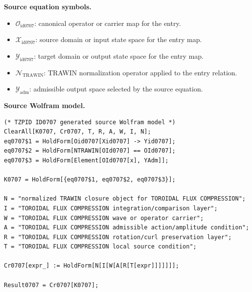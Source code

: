 \begin{minipage}[t]{0.49\linewidth}
\begingroup
\small
\raggedright
\textbf{Source equation symbols.}\par
\begin{itemize}[leftmargin=1.35em,itemsep=1pt,topsep=1pt,parsep=0pt]
    \item $\mathcal{O}_{\mathrm{id0707}}$: canonical operator or carrier map for the entry.
    \item $\mathcal{X}_{\mathrm{id0707}}$: source domain or input state space for the entry map.
    \item $\mathcal{Y}_{\mathrm{id0707}}$: target domain or output state space for the entry map.
    \item $\mathcal{N}_{\mathrm{TRAWIN}}$: TRAWIN normalization operator applied to the entry relation.
    \item $\mathcal{Y}_{\mathrm{adm}}$: admissible output space selected by the source equation.
\end{itemize}
\endgroup
\end{minipage}\hfill
\begin{minipage}[t]{0.47\linewidth}
\begingroup
\scriptsize
\raggedright
\textbf{Source Wolfram model.}\par
\begin{Verbatim}[fontsize=\tiny,breaklines=true,breakanywhere=true]
(* TZPID ID0707 generated source Wolfram model *)
ClearAll[K0707, Cr0707, T, R, A, W, I, N];
eq0707$1 = HoldForm[Oid0707[Xid0707] -> Yid0707];
eq0707$2 = HoldForm[NTRAWIN[OId0707] == OId0707];
eq0707$3 = HoldForm[Element[OId0707[x], YAdm]];

K0707 = HoldForm[{eq0707$1, eq0707$2, eq0707$3}];

N = "normalized TRAWIN closure object for TOROIDAL FLUX COMPRESSION";
I = "TOROIDAL FLUX COMPRESSION integration/comparison layer";
W = "TOROIDAL FLUX COMPRESSION wave or operator carrier";
A = "TOROIDAL FLUX COMPRESSION admissible action/amplitude condition";
R = "TOROIDAL FLUX COMPRESSION rotation/curl preservation layer";
T = "TOROIDAL FLUX COMPRESSION local source condition";

Cr0707[expr_] := HoldForm[N[I[W[A[R[T[expr]]]]]]];

Result0707 = Cr0707[K0707];
\end{Verbatim}
\endgroup
\end{minipage}


